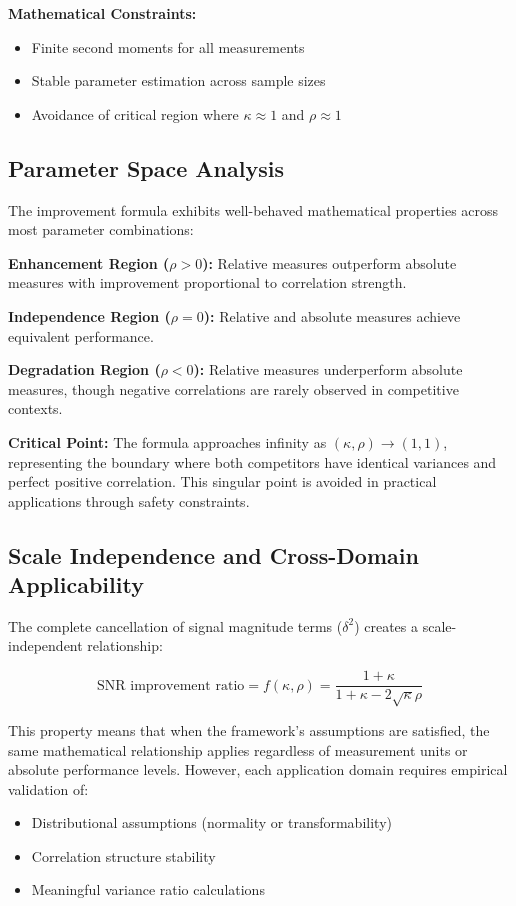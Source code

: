 \textbf{Mathematical Constraints:}
\begin{itemize}
    \item Finite second moments for all measurements
    \item Stable parameter estimation across sample sizes
    \item Avoidance of critical region where $\kappa \approx 1$ and $\rho \approx 1$
\end{itemize}

\subsection{Parameter Space Analysis}

The improvement formula exhibits well-behaved mathematical properties across most parameter combinations:

\textbf{Enhancement Region ($\rho > 0$):} Relative measures outperform absolute measures with improvement proportional to correlation strength.

\textbf{Independence Region ($\rho = 0$):} Relative and absolute measures achieve equivalent performance.

\textbf{Degradation Region ($\rho < 0$):} Relative measures underperform absolute measures, though negative correlations are rarely observed in competitive contexts.

\textbf{Critical Point:} The formula approaches infinity as $(\kappa, \rho) \rightarrow (1, 1)$, representing the boundary where both competitors have identical variances and perfect positive correlation. This singular point is avoided in practical applications through safety constraints.

\subsection{Scale Independence and Cross-Domain Applicability}

The complete cancellation of signal magnitude terms ($\delta^2$) creates a scale-independent relationship:

$$\text{SNR improvement ratio} = f(\kappa, \rho) = \frac{1 + \kappa}{1 + \kappa - 2\sqrt{\kappa}\rho}$$

This property means that when the framework's assumptions are satisfied, the same mathematical relationship applies regardless of measurement units or absolute performance levels. However, each application domain requires empirical validation of:
\begin{itemize}
    \item Distributional assumptions (normality or transformability)
    \item Correlation structure stability
    \item Meaningful variance ratio calculations
\end{itemize}

